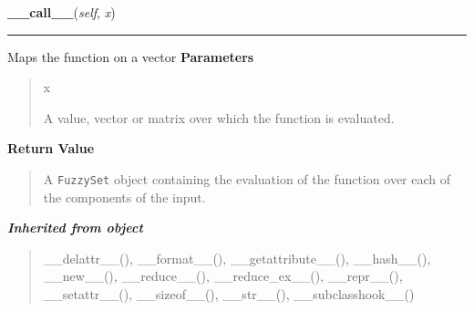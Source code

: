     \label{peach:fuzzy:mf:Membership:__call__}

    \vspace{0.5ex}

\hspace{.8\funcindent}\begin{boxedminipage}{\funcwidth}

    \raggedright \textbf{\_\_call\_\_}(\textit{self}, \textit{x})

    \vspace{-1.5ex}

    \rule{\textwidth}{0.5\fboxrule}
\setlength{\parskip}{2ex}

Maps the function on a vector
\setlength{\parskip}{1ex}
      \textbf{Parameters}
      \vspace{-1ex}

      \begin{quote}
        \begin{Ventry}{x}

          \item[x]


A value, vector or matrix over which the function is evaluated.
        \end{Ventry}

      \end{quote}

      \textbf{Return Value}
    \vspace{-1ex}

      \begin{quote}

A \texttt{FuzzySet} object containing the evaluation of the function over
each of the components of the input.
      \end{quote}

    \end{boxedminipage}


\large{\textbf{\textit{Inherited from object}}}

\begin{quote}
\_\_delattr\_\_(), \_\_format\_\_(), \_\_getattribute\_\_(), \_\_hash\_\_(), \_\_new\_\_(), \_\_reduce\_\_(), \_\_reduce\_ex\_\_(), \_\_repr\_\_(), \_\_setattr\_\_(), \_\_sizeof\_\_(), \_\_str\_\_(), \_\_subclasshook\_\_()
\end{quote}


